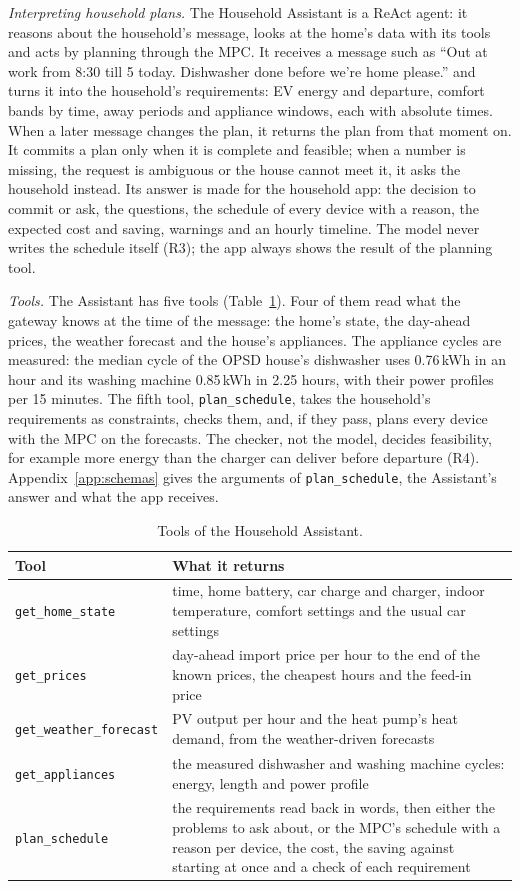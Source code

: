 \textit{Interpreting household plans.} The Household Assistant is a
ReAct agent: it reasons about the household's message, looks at the
home's data with its tools and acts by planning through the MPC. It
receives a message such as ``Out at work from 8:30 till 5 today.
Dishwasher done before we're home please.'' and turns it into the
household's requirements: EV energy and departure, comfort bands by
time, away periods and appliance windows, each with absolute times.
When a later message changes the plan, it returns the plan from that
moment on. It commits a plan only when it is complete and feasible;
when a number is missing, the request is ambiguous or the house cannot
meet it, it asks the household instead. Its answer is made for the
household app: the decision to commit or ask, the questions, the
schedule of every device with a reason, the expected cost and saving,
warnings and an hourly timeline. The model never writes the schedule
itself (R3); the app always shows the result of the planning tool.

\textit{Tools.} The Assistant has five tools
(Table~\ref{tab:reacttools}). Four of them read what the gateway knows
at the time of the message: the home's state, the day-ahead prices, the
weather forecast and the house's appliances. The appliance cycles are
measured: the median cycle of the OPSD house's dishwasher uses
0.76\,kWh in an hour and its washing machine 0.85\,kWh in 2.25 hours,
with their power profiles per 15 minutes. The fifth tool,
\texttt{plan\_schedule}, takes the household's requirements as
constraints, checks them, and, if they pass, plans every device with
the MPC on the forecasts. The checker, not the model, decides
feasibility, for example more energy than the charger can deliver
before departure (R4). Appendix~\ref{app:schemas} gives the arguments
of \texttt{plan\_schedule}, the Assistant's answer and what the app
receives.

\begin{table}[htbp]
\caption{Tools of the Household Assistant.}
\label{tab:reacttools}
\small
\begin{tabularx}{\textwidth}{@{}>{\raggedright\arraybackslash}p{4.4cm}X@{}}
\toprule
Tool & What it returns \\
\midrule
\texttt{get\_home\_state} & time, home battery, car charge and charger, indoor temperature, comfort settings and the usual car settings \\
\texttt{get\_prices} & day-ahead import price per hour to the end of the known prices, the cheapest hours and the feed-in price \\
\texttt{get\_weather\_forecast} & PV output per hour and the heat pump's heat demand, from the weather-driven forecasts \\
\texttt{get\_appliances} & the measured dishwasher and washing machine cycles: energy, length and power profile \\
\texttt{plan\_schedule} & the requirements read back in words, then either the problems to ask about, or the MPC's schedule with a reason per device, the cost, the saving against starting at once and a check of each requirement \\
\bottomrule
\end{tabularx}
\end{table}

